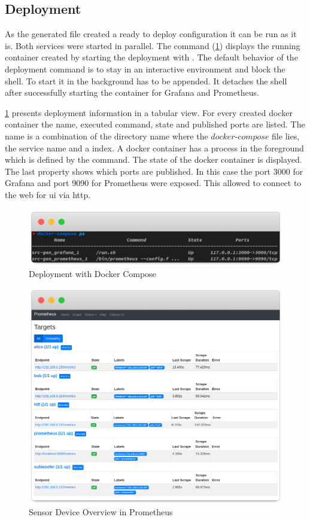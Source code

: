 \subsection{Deployment}
As the generated file created a ready to deploy configuration it can be run as it is. Both services were started in parallel. The command  (\cref{fig:deployment}) displays the running container created by starting the deployment with . The default behavior of the deployment command is to stay in an interactive environment and block the shell. To start it in the background  has to be appended. It detaches the shell after successfully starting the container for Grafana and Prometheus. 


\cref{fig:deployment} presents deployment information in a tabular view. For every created docker container the name, executed command, state and published ports are listed. The name is a combination of the directory name where the $docker\text{-}compose$ file lies, the service name and a index. A docker container has a process in the foreground which is defined by the command. The state of the docker container is displayed. The last property shows which ports are published. In this case the port 3000 for Grafana and port 9090 for Prometheus were exposed. This allowed to connect to the web for \gls{ui} via \gls{http}.

\begin{figure}[!ht]
	\includegraphics[width=\linewidth]{assets/images/terminal2}
	\caption{Deployment with Docker Compose}
	\label{fig:deployment}
\end{figure}

\begin{figure}[!ht]
	\includegraphics[width=\linewidth]{assets/images/prometheus}
	\caption{Sensor Device Overview in Prometheus}
	\label{fig:prometheus}
\end{figure}

